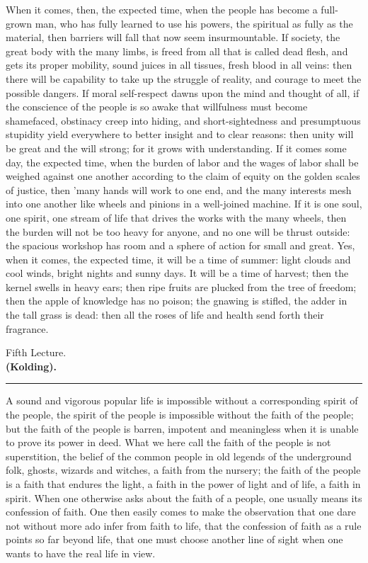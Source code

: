 \documentclass[12pt,a4paper,openany]{book}
\newcommand{\opage}[1]{\marginnote{\footnotesize\textit{[#1]}}}
\newcounter{lect}
\newcommand{\lecture}[2]{\clearpage\stepcounter{lect}\phantomsection\addcontentsline{toc}{chapter}{#1 \csname lecturetitle\arabic{lect}\endcsname}\begin{center}{\large #1}\\[0.4em]{\normalsize\bfseries #2}\\[0.4em]\rule{3em}{0.4pt}\end{center}\medskip\noindent\ignorespaces}
\begin{document}
When it comes, then, the expected time, when
the people has become a full-grown man, who has fully
learned to use his powers, the spiritual as fully as
the material, then barriers will fall that now seem
insurmountable. If society, the great body
with the many limbs, is freed from all that is called
dead flesh, and gets its proper mobility, sound juices in
all tissues, fresh blood in all veins: then there will be
capability to take up the struggle of reality, and courage
to meet the possible dangers. If moral self-respect
dawns upon the mind and thought of all, if the conscience of the people is
so awake that willfulness must become shamefaced,
obstinacy creep into hiding, and short-sightedness
and presumptuous stupidity yield everywhere to better insight
and to clear reasons: then unity will be great and
\setcounter{footnote}{0}%
\opage{69}the will strong; for it grows with understanding. If it comes
some day, the expected time, when the burden of labor
and the wages of labor shall be weighed against one another according to the
claim of equity on the golden scales of justice, then
'many hands will work to one end, and the many
interests mesh into one another like wheels and pinions in
a well-joined machine. If it is one soul, one
spirit, one stream of life that drives the works with the
many wheels, then the burden will not be too heavy for anyone,
and no one will be thrust outside: the spacious workshop has
room and a sphere of action for small and great. Yes, when it
comes, the expected time, it will be a time of summer:
light clouds and cool winds, bright nights and sunny
days. It will be a time of harvest; then the kernel swells
in
heavy ears; then ripe fruits are plucked from
the tree of freedom; then the apple of knowledge has no poison; the gnawing
is stifled, the adder in the tall grass is dead: then all
the roses of life and health send forth their fragrance.

\setcounter{footnote}{0}%
\lecture{Fifth Lecture.} {(Kolding).}
\opage{70}A sound and vigorous popular life is impossible without a corresponding
spirit of the people, the spirit of the people is impossible without the faith of the people;
but the faith of the people is barren, impotent and meaningless
when it is unable to prove its power in deed.
What we here call the faith of the people is not superstition, the belief of the common people
in old legends of the underground folk, ghosts, wizards
and witches, a faith from the nursery; the faith of the people is
a faith that endures the light, a faith in the power of light and of life,
a faith in spirit. When one otherwise asks about
the faith of a people, one usually means its confession of faith.
One then easily comes to make the observation that
one dare not without more ado infer from faith to life, that
the confession of faith as a rule points so far
beyond life, that one must choose another line of sight
when one wants to have the real life in view.
\end{document}
